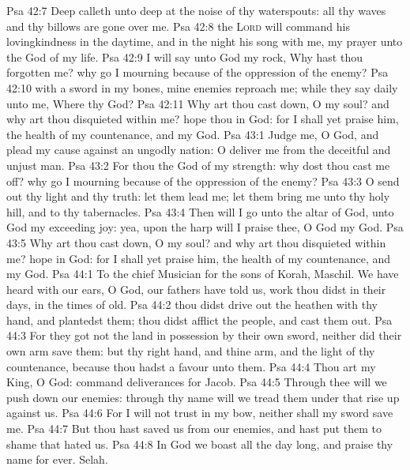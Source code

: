 \vs Psa 42:7 Deep calleth unto deep at the noise of thy waterspouts: all thy waves and thy billows are gone over me.
\vs Psa 42:8  the \textsc{Lord} will command his lovingkindness in the daytime, and in the night his song  with me,  my prayer unto the God of my life.
\vs Psa 42:9 I will say unto God my rock, Why hast thou forgotten me? why go I mourning because of the oppression of the enemy?
\vs Psa 42:10  with a sword in my bones, mine enemies reproach me; while they say daily unto me, Where  thy God?
\vs Psa 42:11 Why art thou cast down, O my soul? and why art thou disquieted within me? hope thou in God: for I shall yet praise him,  the health of my countenance, and my God.
\vs Psa 43:1 Judge me, O God, and plead my cause against an ungodly nation: O deliver me from the deceitful and unjust man.
\vs Psa 43:2 For thou  the God of my strength: why dost thou cast me off? why go I mourning because of the oppression of the enemy?
\vs Psa 43:3 O send out thy light and thy truth: let them lead me; let them bring me unto thy holy hill, and to thy tabernacles.
\vs Psa 43:4 Then will I go unto the altar of God, unto God my exceeding joy: yea, upon the harp will I praise thee, O God my God.
\vs Psa 43:5 Why art thou cast down, O my soul? and why art thou disquieted within me? hope in God: for I shall yet praise him,  the health of my countenance, and my God.
\vs Psa 44:1 To the chief Musician for the sons of Korah, Maschil. We have heard with our ears, O God, our fathers have told us,  work thou didst in their days, in the times of old.
\vs Psa 44:2  thou didst drive out the heathen with thy hand, and plantedst them;  thou didst afflict the people, and cast them out.
\vs Psa 44:3 For they got not the land in possession by their own sword, neither did their own arm save them: but thy right hand, and thine arm, and the light of thy countenance, because thou hadst a favour unto them.
\vs Psa 44:4 Thou art my King, O God: command deliverances for Jacob.
\vs Psa 44:5 Through thee will we push down our enemies: through thy name will we tread them under that rise up against us.
\vs Psa 44:6 For I will not trust in my bow, neither shall my sword save me.
\vs Psa 44:7 But thou hast saved us from our enemies, and hast put them to shame that hated us.
\vs Psa 44:8 In God we boast all the day long, and praise thy name for ever. Selah.
